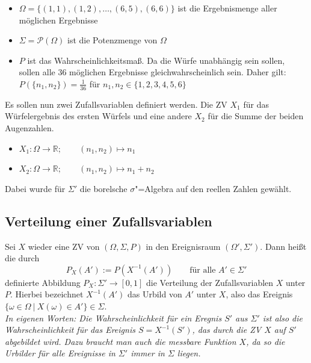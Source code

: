 \documentclass[paper=a4,10pt]{scrartcl}
\begin{document}
\begin{itemize}
\item $\Omega = \{ (1,1), (1,2), \dots, (6,5), (6,6) \}$ ist die Ergebnismenge aller möglichen Ergebnisse
\item $\Sigma = \mathcal{P}(\Omega)$ ist die Potenzmenge von $\Omega$
\item $P$ ist das Wahrscheinlichkeitsmaß. Da die Würfe unabhängig sein sollen, sollen alle 36 möglichen Ergebnisse gleichwahrscheinlich sein. Daher gilt: $P(\{ n_1, n_2\}) = \frac{1}{36}$ für $n_1, n_2 \in \{ 1,2,3,4,5,6\}$
\end{itemize}

\noindent
Es sollen nun zwei Zufallsvariablen definiert werden. Die ZV $X_1$ für das Würfelergebnis des ersten Würfels und eine andere $X_2$ für die Summe der beiden Augenzahlen.

\begin{itemize}
\item $X_1: \Omega \rightarrow \mathbb{R}; \qquad (n_1, n_2) \mapsto n_1$
\item $X_2: \Omega \rightarrow \mathbb{R}; \qquad (n_1, n_2) \mapsto n_1 + n_2$
\end{itemize}
Dabei wurde für $\Sigma'$ die borelsche $\sigma$"=Algebra auf den reellen Zahlen gewählt.

\subsection{Verteilung einer Zufallsvariablen}
Sei $X$ wieder eine ZV von $(\Omega, \Sigma, P)$ in den Ereignisraum $(\Omega', \Sigma')$. Dann heißt die durch
\begin{equation}
P_X(A') := P(X^{-1}(A')) \qquad \text{für alle }A' \in \Sigma' 
\end{equation}
definierte Abbildung $P_X: \Sigma' \rightarrow [0, 1]$ die Verteilung der Zufallsvariablen $X$ unter $P$. Hierbei bezeichnet $X^{-1}(A')$ das Urbild von $A'$ unter $X$, also das Ereignis
$\{ \omega \in \Omega \ | \ X(\omega) \in A' \} \in \Sigma$. \\

\noindent
\textit{In eigenen Worten: Die Wahrscheinlichkeit für ein Eregnis $S'$ aus $\Sigma'$ ist also die Wahrscheinlichkeit für das Ereignis $S = X^{-1}(S')$, das durch die ZV $X$ auf $S'$ abgebildet wird. Dazu braucht man auch die messbare Funktion $X$, da so die Urbilder für alle Ereignisse in $\Sigma'$ immer in $\Sigma$ liegen.}



\end{document}
